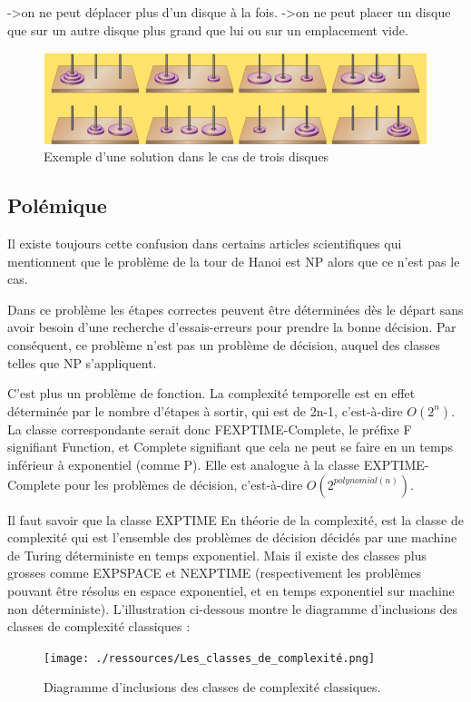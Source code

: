 ->on ne peut déplacer plus d'un disque à la fois.
->on ne peut placer un disque que sur un autre disque plus grand que lui ou sur un emplacement vide.

\begin{figure}[H]
    \centering
        \includegraphics[scale=0.5]{./ressources/Présentation_du_problème.png}
        \caption{Exemple d'une solution dans le cas de trois disques}
    \label{fig:representationProbleme}
\end{figure}

\subsection{Polémique}
Il existe toujours cette confusion dans certains articles scientifiques qui mentionnent que le problème de la tour de Hanoi est NP alors que ce n'est pas le cas.

Dans ce problème les étapes correctes peuvent être déterminées dès le départ sans avoir besoin d'une recherche d'essais-erreurs pour prendre la bonne décision. Par conséquent, ce problème n'est pas un problème de décision, auquel des classes telles que NP s'appliquent.

C'est plus un problème de fonction. La complexité temporelle est en effet déterminée par le nombre d'étapes à sortir, qui est de 2n-1, c'est-à-dire $O(2^n).$
La classe correspondante serait donc FEXPTIME-Complete, le préfixe F signifiant Function, et Complete signifiant que cela ne peut se faire en un temps inférieur à exponentiel (comme P). Elle est analogue à la classe EXPTIME-Complete pour les problèmes de décision, c'est-à-dire $O(2^{polynomial(n)})$.

Il faut savoir que la classe EXPTIME En théorie de la complexité, est la classe de complexité qui est l'ensemble des problèmes de décision décidés par une machine de Turing déterministe en temps exponentiel.  Mais il existe des classes plus grosses comme EXPSPACE et NEXPTIME (respectivement les problèmes pouvant être résolus en espace exponentiel, et en temps exponentiel sur machine non déterministe).
L'illustration ci-dessous montre le diagramme d'inclusions des classes de complexité classiques :
\begin{figure}[H]
    \centering
        \texttt{[image: ./ressources/Les\_classes\_de\_complexité.png]}
        \caption{Diagramme d'inclusions des classes de complexité classiques.}
    \label{fig:classeComplexite}
\end{figure}

